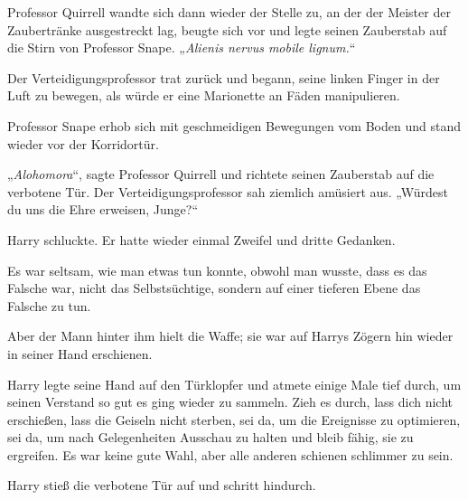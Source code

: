 Professor Quirrell wandte sich dann wieder der Stelle zu, an der der Meister der Zaubertränke ausgestreckt lag, beugte sich vor und legte seinen Zauberstab auf die Stirn von Professor Snape. „\emph{Alienis nervus mobile lignum.}“

Der Verteidigungsprofessor trat zurück und begann, seine linken Finger in der Luft zu bewegen, als würde er eine Marionette an Fäden manipulieren.

Professor Snape erhob sich mit geschmeidigen Bewegungen vom Boden und stand wieder vor der Korridortür.

„\emph{Alohomora}“, sagte Professor Quirrell und richtete seinen Zauberstab auf die verbotene Tür.
Der Verteidigungsprofessor sah ziemlich amüsiert aus.
„Würdest du uns die Ehre erweisen, Junge?“

Harry schluckte. Er hatte wieder einmal Zweifel und dritte Gedanken.

Es war seltsam, wie man etwas tun konnte, obwohl man wusste, dass es das Falsche war, nicht das Selbstsüchtige, sondern auf einer tieferen Ebene das Falsche zu tun.

Aber der Mann hinter ihm hielt die Waffe; sie war auf Harrys Zögern hin wieder in seiner Hand erschienen.

Harry legte seine Hand auf den Türklopfer und atmete einige Male tief durch, um seinen Verstand so gut es ging wieder zu sammeln.
Zieh es durch, lass dich nicht erschießen, lass die Geiseln nicht sterben, sei da, um die Ereignisse zu optimieren, sei da, um nach Gelegenheiten Ausschau zu halten und bleib fähig, sie zu ergreifen.
Es war keine gute Wahl, aber alle anderen schienen schlimmer zu sein.

Harry stieß die verbotene Tür auf und schritt hindurch.

